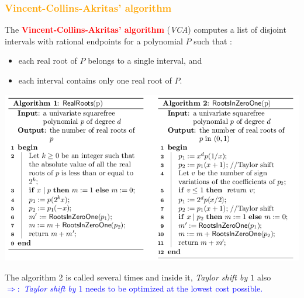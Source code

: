 \begin{frame}[fragile]
\frametitle{\textbf{\textcolor{orange}{Vincent-Collins-Akritas' algorithm}}}

\begin{block}{}
The \textcolor{red}{\textbf{Vincent-Collins-Akritas' algorithm}} (\textit{VCA}) computes a list of disjoint intervals with rational endpoints for a polynomial $P$ such that :

\begin{itemize}
\item each real root of $P$ belongs to a single interval, and
\item each interval contains only one real root of $P$.
\end{itemize}
\end{block}

\begin{center}
\includegraphics[scale = 0.2]{VCAalgo.png}
\end{center}

\begin{block}{}
The algorithm 2 is called several times and inside it, \textit{Taylor shift by $1$} also\\
\textcolor{blue}{\underline{$\Longrightarrow :$} \textit{Taylor shift by $1$} needs to be optimized at the lowest cost possible.}
\end{block}

\end{frame}

